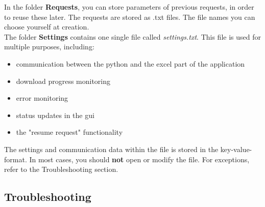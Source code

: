 In the folder \textbf{Requests}, you can store parameters of previous requests, in order to reuse these later. The requests are stored as .txt files. The file names you can choose yourself at creation. \\

The folder \textbf{Settings} contains one single file called \textit{settings.txt}. This file is used for multiple purposes, including: 

\begin{itemize}
	\item communication between the python and the excel part of the application
	\item download progress monitoring
	\item error monitoring
	\item status updates in the gui
	\item the "resume request" functionality
\end{itemize}
The settings and communication data within the file is stored in the key-value-format. In most cases, you should \textbf{not} open or modify the file. For exceptions, refer to the Troubleshooting section. 

\subsection{Troubleshooting}

